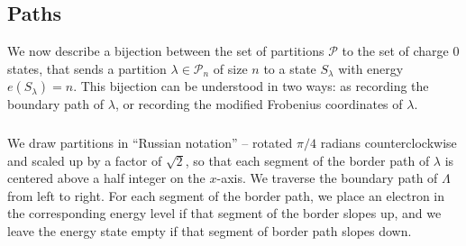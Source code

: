 \documentclass{amsart}[12pt]
\theoremstyle{definition}
\begin{document}
\subsection{Paths}

We now describe a bijection between the set of partitions $\mathcal{P}$ to the
set of charge 0 states, that sends a partition
$\lambda\in\mathcal{P}_n$ of size $n$ to a state $S_\lambda$ with
energy $e(S_\lambda)=n$.  This bijection can be understood in two ways:
as recording the boundary path of $\lambda$, or recording the modified
Frobenius coordinates of $\lambda$.


\subsubsection{}
We draw partitions in ``Russian
notation'' -- rotated $\pi/4$ radians counterclockwise and scaled up
by a factor of $\sqrt{2}$, so that each segment of the border path of
$\lambda$ is centered above a half integer on the $x$-axis.  We traverse the boundary path of $\Lambda$ from left to right.  For each segment of the border path, we place an electron in the corresponding energy level if that segment of the border slopes up, and we leave the energy state empty if that segment of border path slopes down.
\end{document}
